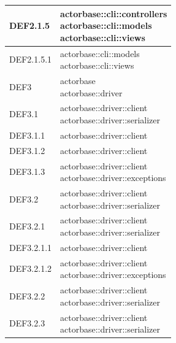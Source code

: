 \documentclass{scalatekids-article}
\begin{document}
\begin{longtable}[H]{|p{3.5cm}|p{7.5cm}|}
  \hline
  DEF2.1.5 & \multiLineCell[t]{actorbase::cli::controllers\\actorbase::cli::models\\actorbase::cli::views\\}\\
  \hline
  DEF2.1.5.1 & \multiLineCell[t]{actorbase::cli::models\\actorbase::cli::views\\}\\
  \hline
  DEF3 & \multiLineCell[t]{actorbase\\actorbase::driver\\}\\
  \hline
  DEF3.1 & \multiLineCell[t]{actorbase::driver::client\\actorbase::driver::serializer\\}\\
  \hline
  DEF3.1.1 & \multiLineCell[t]{actorbase::driver::client\\}\\
  \hline
  DEF3.1.2 & \multiLineCell[t]{actorbase::driver::client\\}\\
  \hline
  DEF3.1.3 & \multiLineCell[t]{actorbase::driver::client\\actorbase::driver::exceptions\\}\\
  \hline
  DEF3.2 & \multiLineCell[t]{actorbase::driver::client\\actorbase::driver::serializer\\}\\
  \hline
  DEF3.2.1 & \multiLineCell[t]{actorbase::driver::client\\actorbase::driver::serializer\\}\\
  \hline
  DEF3.2.1.1 & \multiLineCell[t]{actorbase::driver::client\\}\\
  \hline
  DEF3.2.1.2 & \multiLineCell[t]{actorbase::driver::client\\actorbase::driver::exceptions\\}\\
  \hline
  DEF3.2.2 & \multiLineCell[t]{actorbase::driver::client\\actorbase::driver::serializer\\}\\
  \hline
  DEF3.2.3 & \multiLineCell[t]{actorbase::driver::client\\actorbase::driver::serializer\\}\\

\end{longtable}
\end{document}
